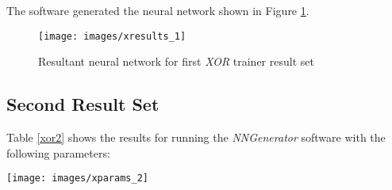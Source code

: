 The software generated the neural network shown in Figure \ref{xresults_1}.

\begin{figure}[hbt!]
  \centering
  \texttt{[image: images/xresults\_1]}
  \caption{Resultant neural network for first {\it XOR} trainer result set}
  \label{xresults_1}
\end{figure}

\subsection{Second Result Set}

Table \ref{xor2} shows the results for running the {\it NNGenerator}
software with the following parameters: 

\begin{center}
\texttt{[image: images/xparams\_2]}
\end{center}

